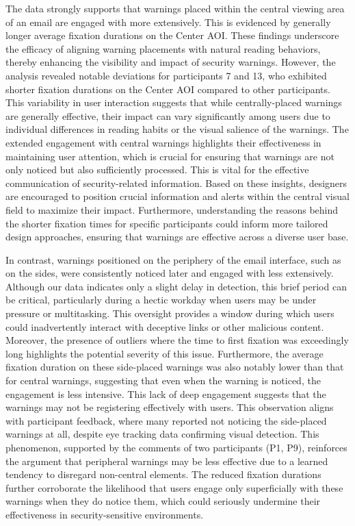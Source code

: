 \documentclass[
  a4paper,  %
  twoside,  %
  bibliography=totoc,
  headsepline,
  cleardoublepage=empty,
  parskip=half,
  draft=false
]{scrbook}
\begin{document}
The data strongly supports that warnings placed within the central viewing area of an email are engaged with more extensively. This is evidenced by generally longer average fixation durations on the Center AOI. These findings underscore the efficacy of aligning warning placements with natural reading behaviors, thereby enhancing the visibility and impact of security warnings. \newline However, the analysis revealed notable deviations for participants 7 and 13, who exhibited shorter fixation durations on the Center AOI compared to other participants. This variability in user interaction suggests that while centrally-placed warnings are generally effective, their impact can vary significantly among users due to individual differences in reading habits or the visual salience of the warnings. \newline
The extended engagement with central warnings highlights their effectiveness in maintaining user attention, which is crucial for ensuring that warnings are not only noticed but also sufficiently processed. This is vital for the effective communication of security-related information. Based on these insights, designers are encouraged to position crucial information and alerts within the central visual field to maximize their impact. Furthermore, understanding the reasons behind the shorter fixation times for specific participants could inform more tailored design approaches, ensuring that warnings are effective across a diverse user base.

In contrast, warnings positioned on the periphery of the email interface, such as on the sides, were consistently noticed later and engaged with less extensively. Although our data indicates only a slight delay in detection, this brief period can be critical, particularly during a hectic workday when users may be under pressure or multitasking. This oversight provides a window during which users could inadvertently interact with deceptive links or other malicious content. Moreover, the presence of outliers where the time to first fixation was exceedingly long highlights the potential severity of this issue. \newline
Furthermore, the average fixation duration on these side-placed warnings was also notably lower than that for central warnings, suggesting that even when the warning is noticed, the engagement is less intensive. This lack of deep engagement suggests that the warnings may not be registering effectively with users. This observation aligns with participant feedback, where many reported not noticing the side-placed warnings at all, despite eye tracking data confirming visual detection. \newline
This phenomenon, supported by the comments of two participants (P1, P9), reinforces the argument that peripheral warnings may be less effective due to a learned tendency to disregard non-central elements. The reduced fixation durations further corroborate the likelihood that users engage only superficially with these warnings when they do notice them, which could seriously undermine their effectiveness in security-sensitive environments.
\end{document}
